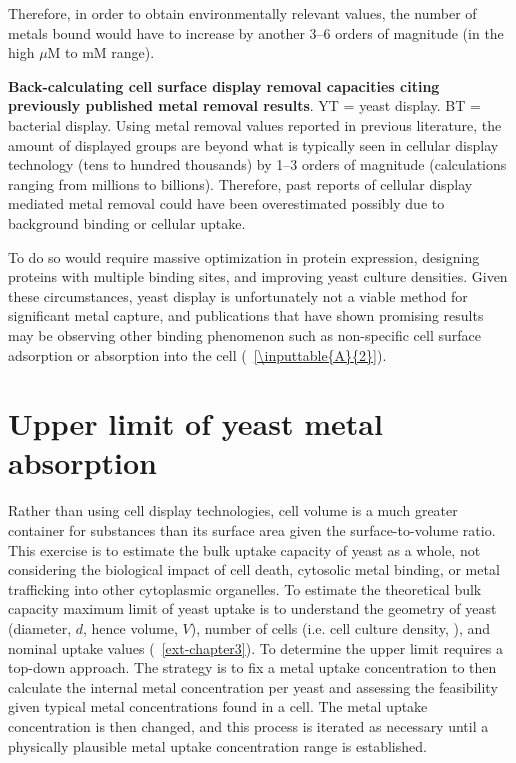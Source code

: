 \documentclass[../main/main]{subfiles}
\begin{document}
Therefore, in order to obtain environmentally relevant values, the number of metals bound would have to increase by another 3--6 orders of magnitude (in the high $\mu$M to mM range).

\begin{table}[H]
	\centering
	
	\caption[Back-calculating cell surface display removal capacities citing previously published metal removal results]
	{
		\textbf{Back-calculating cell surface display removal capacities citing previously published metal removal results}.
		YT = yeast display. BT = bacterial display.
		Using metal removal values reported in previous literature, the amount of displayed groups are beyond what is typically seen in cellular display technology (tens to hundred thousands) by 1--3 orders of magnitude (calculations ranging from millions to billions). Therefore, past reports of cellular display mediated metal removal could have been overestimated possibly due to background binding or cellular uptake.
	}
	\label{\inputtable{A}{2}}
\end{table}

\noindent To do so would require massive optimization in protein expression, designing proteins with multiple binding sites, and improving yeast culture densities. Given these circumstances, yeast display is unfortunately not a viable method for significant metal capture, and publications that have shown promising results may be observing other binding phenomenon such as non-specific cell surface adsorption or absorption into the cell (\TABLE~\ref{\inputtable{A}{2}}).

\section{Upper limit of yeast metal absorption}
\label{section:metal-uptake}
Rather than using cell display technologies, cell volume is a much greater container for substances than its surface area given the surface-to-volume ratio. This exercise is to estimate the bulk uptake capacity of yeast as a whole, not considering the biological impact of cell death, cytosolic metal binding, or metal trafficking into other cytoplasmic organelles. To estimate the theoretical bulk capacity maximum limit of yeast uptake is to understand the geometry of yeast (diameter, $d$, hence volume, $V$), number of cells (i.e. cell culture density, \OD), and nominal uptake values (\CHAPTER~\ref{ext-chapter3}). To determine the upper limit requires a top-down approach. The strategy is to fix a metal uptake concentration to then calculate the internal metal concentration per yeast and assessing the feasibility given typical metal concentrations found in a cell. The metal uptake concentration is then changed, and this process is iterated as necessary until a physically plausible metal uptake concentration range is established.
\end{document}
